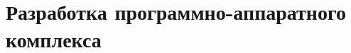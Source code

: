 \documentclass[russian,utf8,pointsection]{eskdtext}
\begin{document}
\maketitle
\tableofcontents

\newpage






\newpage
\section{Разработка программно-аппаратного комплекса}





\end{document}
